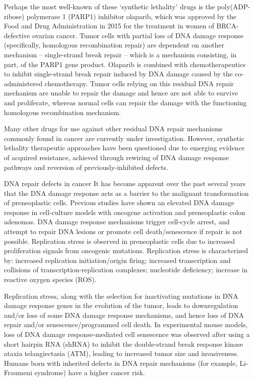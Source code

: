 Perhaps the most well-known of these `synthetic lethality' drugs is the poly(ADP-ribose) polymerase 1 (PARP1) inhibitor olaparib, which was approved by the Food and Drug Administration in 2015 for the treatment in women of BRCA-defective ovarian cancer. Tumor cells with partial loss of DNA damage response (specifically, homologous recombination repair) are dependent on another mechanism -- single-strand break repair -- which is a mechanism consisting, in part, of the PARP1 gene product. Olaparib is combined with chemotherapeutics to inhibit single-strand break repair induced by DNA damage caused by the co-administered chemotherapy. Tumor cells relying on this residual DNA repair mechanism are unable to repair the damage and hence are not able to survive and proliferate, whereas normal cells can repair the damage with the functioning homologous recombination mechanism.

Many other drugs for use against other residual DNA repair mechanisms commonly found in cancer are currently under investigation. However, synthetic lethality therapeutic approaches have been questioned due to emerging evidence of acquired resistance, achieved through rewiring of DNA damage response pathways and reversion of previously-inhibited defects.

DNA repair defects in cancer
It has become apparent over the past several years that the DNA damage response acts as a barrier to the malignant transformation of preneoplastic cells. Previous studies have shown an elevated DNA damage response in cell-culture models with oncogene activation and preneoplastic colon adenomas. DNA damage response mechanisms trigger cell-cycle arrest, and attempt to repair DNA lesions or promote cell death/senescence if repair is not possible. Replication stress is observed in preneoplastic cells due to increased proliferation signals from oncogenic mutations. Replication stress is characterized by: increased replication initiation/origin firing; increased transcription and collisions of transcription-replication complexes; nucleotide deficiency; increase in reactive oxygen species (ROS).

Replication stress, along with the selection for inactivating mutations in DNA damage response genes in the evolution of the tumor, leads to downregulation and/or loss of some DNA damage response mechanisms, and hence loss of DNA repair and/or senescence/programmed cell death. In experimental mouse models, loss of DNA damage response-mediated cell senescence was observed after using a short hairpin RNA (shRNA) to inhibit the double-strand break response kinase ataxia telangiectasia (ATM), leading to increased tumor size and invasiveness. Humans born with inherited defects in DNA repair mechanisms (for example, Li-Fraumeni syndrome) have a higher cancer risk.

